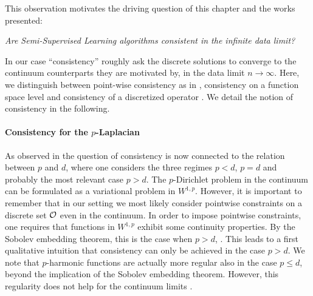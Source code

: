 %
%
\noindent%
This observation motivates the driving question of this chapter and the works presented:
%
\begin{center}
\textit{%
Are Semi-Supervised Learning algorithms consistent in the infinite data limit?}
\end{center}
%
In our case \enquote{consistency} roughly ask the discrete solutions to converge to the continuum counterparts they are motivated by, in the data limit $n\to\infty$. Here, we distinguish between point-wise consistency as in \cite{von2008consistency, gine2006empirical, hein2005graphs}, consistency on a function space level \cite{slepcev2019analysis, GarcSlep15,calder2019consistency, roith2022continuum, bungert2021uniform} and consistency of a discretized operator \cite{calder2019consistency, bungert2022ratio}. We detail the notion of consistency in the following.  
%
%
\paragraph{Consistency for the $p$-Laplacian} 
As observed in \cite{nadler2009statistical, alamgir2011phase, el2016asymptotic} the question of consistency is now connected to the relation between $p$ and $d$, where one considers the three regimes $p<d$, $p=d$ and probably the most relevant case $p>d$. The $p$-Dirichlet problem in the continuum can be formulated as a variational problem in $W^{1,p}$. However, it is important to remember that in our setting we most likely consider pointwise constraints on a discrete set $\mathcal{O}$ even in the continuum. In order to impose pointwise constraints, one requires that functions in $W^{1,p}$ exhibit some continuity properties. By the Sobolev embedding theorem, this is the case when $p>d$, \cite{adams2003sobolev}. This leads to a first qualitative intuition that consistency can only be achieved in the case $p>d$. We note that $p$-harmonic functions are actually more regular also in the case $p\leq d$, beyond the implication of the Sobolev embedding theorem. However, this regularity does not help for the continuum limits \cite{nadler2009statistical, alamgir2011phase, el2016asymptotic}.

